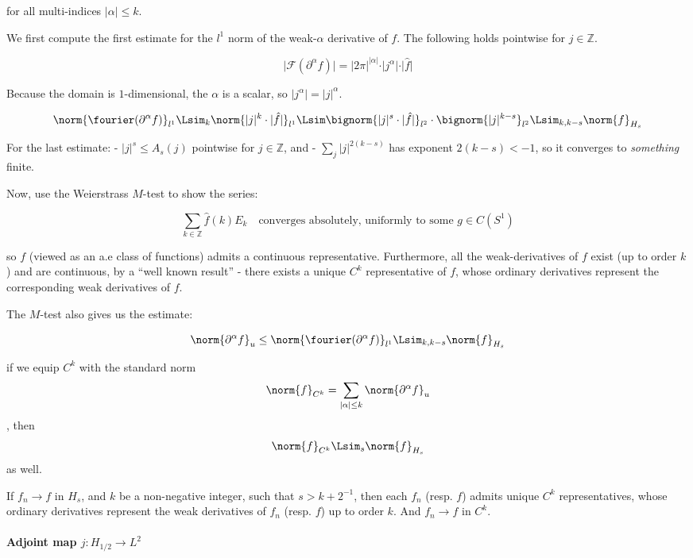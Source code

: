 for all multi-indices \(\vert\alpha\vert\leq k\).

We first compute the first estimate for the \(l^1\) norm of the
weak-\(\alpha\) derivative of \(f\). The following holds pointwise for
\(j\in\mathbb{Z}\).

\[
\vert\mathcal{F}(\partial^\alpha f)\vert = \vert 2\pi\vert^{\vert\alpha\vert}\cdot\vert j^\alpha\vert\cdot\vert \hat{f}\vert
\]

Because the domain is \(1\)-dimensional, the \(\alpha\) is a scalar, so
\(\vert j^\alpha\vert = \vert j\vert^\alpha\).

\[
\norm{\fourier(\partial^\alpha f)}_{l^1}\Lsim_k \norm{\vert j\vert^k\cdot\vert \hat{f}\vert}_{l^1}\Lsim \bignorm{\vert j\vert^s\cdot\vert\hat{f}\vert}_{l^2}\cdot\bignorm{\vert j\vert^{k-s}}_{l^2}\Lsim_{k,k-s}\norm{f}_{H_s}
\]

For the last estimate: - \(\vert j\vert^s\leq A_s(j)\) pointwise for
\(j\in\mathbb{Z}\), and - \(\sum_{j}\vert j\vert^{2(k-s)}\) has exponent
\(2(k-s)<-1\), so it converges to \emph{something} finite.

Now, use the Weierstrass \(M\)-test to show the series:

\[
\sum_{k\in\mathbb{Z}}\hat{f}(k)E_k\quad\text{converges absolutely, uniformly to some }g\in C(S^1)
\]

so \(f\) (viewed as an a.e class of functions) admits a continuous
representative. Furthermore, all the weak-derivatives of \(f\) exist (up
to order \(k\)) and are continuous, by a ``well known result'' - there
exists a unique \(C^k\) representative of \(f\), whose ordinary
derivatives represent the corresponding weak derivatives of \(f\).

The \(M\)-test also gives us the estimate:

\[
\norm{\partial^\alpha f}_u\leq\norm{\fourier(\partial^\alpha f)}_{l^1}\Lsim_{k,k-s} \norm{f}_{H_s}
\]

if we equip \(C^k\) with the standard norm
\[\norm{f}_{C^k} = \sum_{\vert\alpha\vert\leq k}\norm{\partial^\alpha f}_u\],
then \[\norm{f}_{C^k}\Lsim_s \norm{f}_{H_s}\] as well.

If \(f_n\to f\) in \(H_s\), and \(k\) be a non-negative integer, such
that \(s > k + 2^{-1}\), then each \(f_n\) (resp. \(f\)) admits unique
\(C^k\) representatives, whose ordinary derivatives represent the weak
derivatives of \(f_n\) (resp. \(f\)) up to order \(k\). And \(f_n\to f\)
in \(C^k\).

\hypertarget{adjoint-map-j-h_12to-l2}{%
\paragraph{\texorpdfstring{Adjoint map
\(j: H_{1/2}\to L^2\)}{Adjoint map j: H\_\{1/2\}\textbackslash to L\^{}2}}\label{adjoint-map-j-h_12to-l2}}

